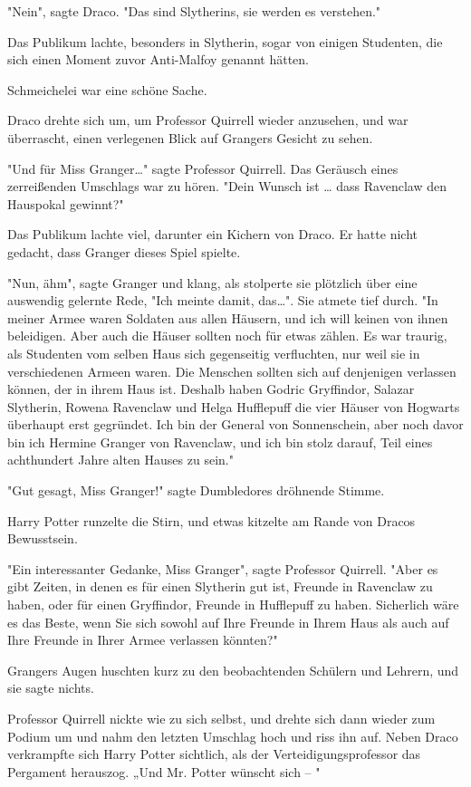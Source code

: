 {"Nein", sagte Draco. "Das sind Slytherins, sie werden es verstehen."

Das Publikum lachte, besonders in Slytherin, sogar von einigen Studenten, die sich einen Moment zuvor Anti-Malfoy genannt hätten.

Schmeichelei war eine schöne Sache.

Draco drehte sich um, um Professor Quirrell wieder anzusehen, und war überrascht, einen verlegenen Blick auf Grangers Gesicht zu sehen.

"Und für Miss Granger…" sagte Professor Quirrell. Das Geräusch eines zerreißenden Umschlags war zu hören. "Dein Wunsch ist … dass Ravenclaw den Hauspokal gewinnt?"

Das Publikum lachte viel, darunter ein Kichern von Draco. Er hatte nicht gedacht, dass Granger dieses Spiel spielte.

"Nun, ähm", sagte Granger und klang, als stolperte sie plötzlich über eine auswendig gelernte Rede, "Ich meinte damit, das…". Sie atmete tief durch. "In meiner Armee waren Soldaten aus allen Häusern, und ich will keinen von ihnen beleidigen. Aber auch die Häuser sollten noch für etwas zählen. Es war traurig, als Studenten vom selben Haus sich gegenseitig verfluchten, nur weil sie in verschiedenen Armeen waren. Die Menschen sollten sich auf denjenigen verlassen können, der in ihrem Haus ist. Deshalb haben Godric Gryffindor, Salazar Slytherin, Rowena Ravenclaw und Helga Hufflepuff die vier Häuser von Hogwarts überhaupt erst gegründet. Ich bin der General von Sonnenschein, aber noch davor bin ich Hermine Granger von Ravenclaw, und ich bin stolz darauf, Teil eines achthundert Jahre alten Hauses zu sein."

"Gut gesagt, Miss Granger!" sagte Dumbledores dröhnende Stimme.

Harry Potter runzelte die Stirn, und etwas kitzelte am Rande von Dracos Bewusstsein.

"Ein interessanter Gedanke, Miss Granger", sagte Professor Quirrell. "Aber es gibt Zeiten, in denen es für einen Slytherin gut ist, Freunde in Ravenclaw zu haben, oder für einen Gryffindor, Freunde in Hufflepuff zu haben. Sicherlich wäre es das Beste, wenn Sie sich sowohl auf Ihre Freunde in Ihrem Haus als auch auf Ihre Freunde in Ihrer Armee verlassen könnten?"

Grangers Augen huschten kurz zu den beobachtenden Schülern und Lehrern, und sie sagte nichts.

Professor Quirrell nickte wie zu sich selbst, und drehte sich dann wieder zum Podium um und nahm den letzten Umschlag hoch und riss ihn auf. Neben Draco verkrampfte sich Harry Potter sichtlich, als der Verteidigungsprofessor das Pergament herauszog. „Und Mr. Potter wünscht sich -- "

}
